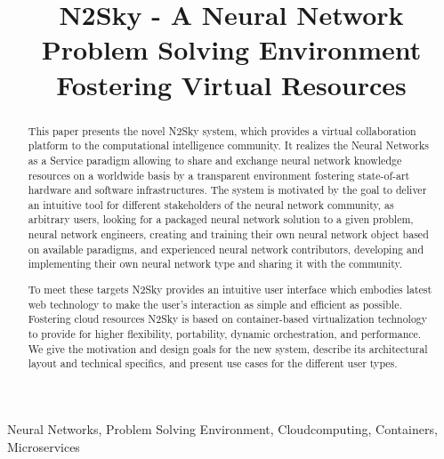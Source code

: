 \documentclass[conference]{IEEEtran}
\begin{document}
\title{N2Sky - A Neural Network Problem Solving Environment Fostering Virtual Resources}

\author{
\and
{}
\and
{}
}

\maketitle

\begin{IEEEkeywords}
Neural Networks, Problem Solving Environment, Cloudcomputing, Containers, Microservices
\end{IEEEkeywords}

\begin{abstract}

This paper presents the novel N2Sky system, which provides a virtual collaboration platform to the computational intelligence community.
It realizes the Neural Networks as a Service paradigm allowing to share and exchange neural network knowledge resources on a worldwide basis by a transparent environment fostering state-of-art hardware and software infrastructures.
The system is motivated by the goal to deliver an intuitive tool for different stakeholders of the neural network community, as arbitrary users, looking for a packaged neural network solution to a given problem, neural network engineers, creating and training their own neural network object based on available paradigms, and experienced neural network contributors, developing and implementing their own neural network type and sharing it with the community.

To meet these targets N2Sky provides an intuitive user interface which embodies latest web technology to make the user's interaction as simple and efficient as possible.
Fostering cloud resources N2Sky is based on container-based virtualization technology to provide for higher flexibility, portability, dynamic orchestration, and performance.
We give the motivation and design goals for the new system, describe its architectural layout and technical specifics, and present use cases for the different user types.

\end{abstract}
\end{document}
